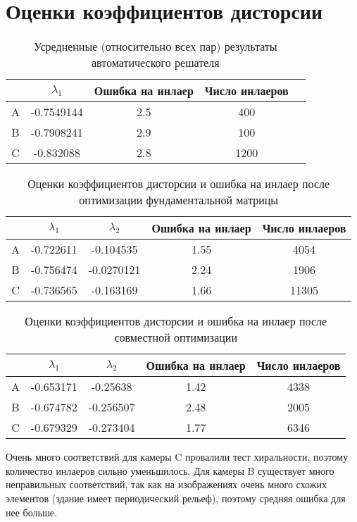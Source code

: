 \section{Оценки коэффициентов дисторсии}
\begin{table}[H]
	\centering
	\begin{tabular}{| c | c | c | c| c | }
		\hline
		& $\lambda_1$ & Ошибка на инлаер & Число инлаеров\\ \hline
		A & -0.7549144 & 2.5              & 400 \\ \hline
		B & -0.7908241  & 2.9              & 100  \\ \hline
		C & -0.832088 & 2.8              & 1200 \\ 
		\hline
	\end{tabular}
	\caption{Усредненные (относительно всех пар) результаты автоматического решателя}
\end{table}

\begin{table}[H]
	\centering
	\begin{tabular}{| c | c | c | c| c | }
		\hline
		& $\lambda_1$ & $\lambda_2$ & Ошибка на инлаер &  Число инлаеров \\ \hline
		A & -0.722611 & -0.104535 & 1.55 & 4054 \\ \hline
		B &  -0.756474 & -0.0270121  & 2.24 & 1906  \\ \hline
		C & -0.736565 & -0.163169 & 1.66 & 11305 \\ 
		\hline
	\end{tabular}
	\caption{Оценки коэффициентов дисторсии и ошибка на инлаер после оптимизации фундаментальной матрицы}
\end{table}

\begin{table}[H]
	\centering
	\begin{tabular}{| c | c | c | c| c | }
		\hline 
		& $\lambda_1$ & $\lambda_2$ & Ошибка на инлаер &  Число инлаеров \\ \hline
		A & -0.653171 & -0.25638 & 1.42 & 4338 \\ \hline
		B & -0.674782 & -0.256507 & 2.48 & 2005  \\ \hline
		C & -0.679329 & -0.273404 & 1.77 & 6346 \\ 
		\hline
	\end{tabular}
	\caption{Оценки коэффициентов дисторсии и ошибка на инлаер после совместной оптимизации}
\end{table}
Очень много соответствий для камеры C провалили тест хиральности, поэтому количество инлаеров сильно уменьшилось. Для камеры B существует много неправильных соответствий, так как на изображениях очень много схожих элементов (здание имеет периодический рельеф), поэтому средняя ошибка для нее больше.
